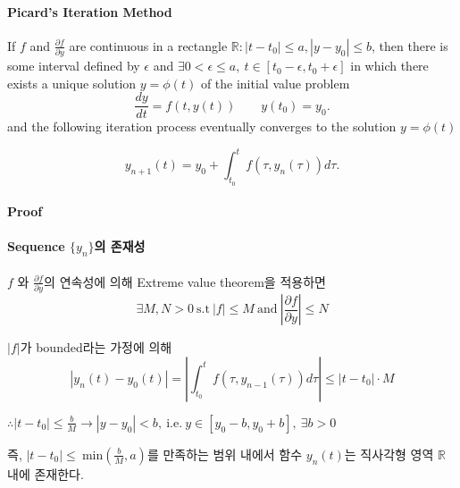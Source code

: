 \documentclass[a4paper,10pt]{article}
\date{2018년 3월 12일}
\begin{document}
 

\paragraph{Picard's Iteration Method} 

If $f$ and $\displaystyle{\frac{\partial f}{\partial y}}$ are continuous in a rectangle $\mathbb{R}: |t - t_0| \leq a, |y - y_0| \leq b$, then there is some interval defined by $\epsilon$ and $\exists 0 < \epsilon \leq a, \ t \in [t_0 - \epsilon, t_0 + \epsilon]$ in which there exists a unique solution $y = \phi(t)$ of the initial value problem
\begin{displaymath}
    \frac{dy}{dt} = f(t, y(t)) \qquad y(t_0) = y_0.
\end{displaymath}
and the following iteration process eventually converges to the solution $y = \phi(t)$

\begin{displaymath}
    y_{n+1}(t) = y_0 + \int_{t_0}^{t} f(\tau , y_n(\tau)) d \tau.
\end{displaymath}

\paragraph{Proof}

\paragraph{Sequence $\{y_n\}$의 존재성}
$f$ 와 $\displaystyle{\frac{\partial f}{\partial y}}$의 연속성에 의해 Extreme value theorem을 적용하면
\begin{displaymath}
    \exists M, N > 0 \ \text{s.t} \ |f| \leq M \ \text{and} \ \left| \frac{\partial f}{\partial y} \right| \leq N
\end{displaymath}

$|f|$가 bounded라는 가정에 의해
\begin{displaymath}
    \left| y_{n}(t) - y_0(t) \right| = \left| \int_{t_0}^{t} f(\tau , y_{n-1}(\tau)) d \tau \right| \leq \left| t - t_0 \right| \cdot M
\end{displaymath}

\begin{center}
$\therefore |t - t_0| \leq \frac{b}{M} \longrightarrow |y - y_0| < b, \ \text{i.e.} \ y \in [y_0 - b, y_0 + b], \ \exists b > 0$
\end{center}
즉, $|t - t_0| \leq \ \text{min}\left( \frac{b}{M}, a \right)$를 만족하는 범위 내에서 함수 $y_n(t)$는 직사각형 영역 $\mathbb{R}$ 내에 존재한다.
\\
\end{document}
